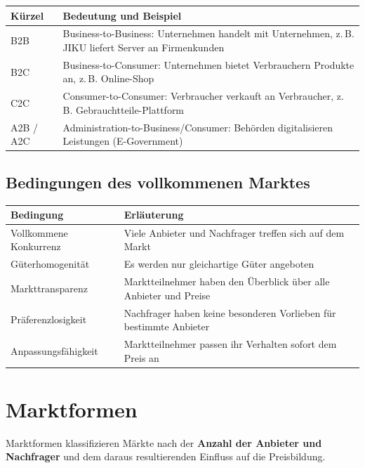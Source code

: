 \documentclass[11pt, a4paper]{article}
\begin{document}
\begin{center}
\begin{tabular}{p{2cm} p{11cm}}
\toprule
\textbf{Kürzel} & \textbf{Bedeutung und Beispiel}\\
\midrule
B2B & Business-to-Business: Unternehmen handelt mit Unternehmen, z.\,B. JIKU liefert Server an Firmenkunden\\
B2C & Business-to-Consumer: Unternehmen bietet Verbrauchern Produkte an, z.\,B. Online-Shop\\
C2C & Consumer-to-Consumer: Verbraucher verkauft an Verbraucher, z.\,B. Gebrauchtteile-Plattform\\
A2B / A2C & Administration-to-Business/Consumer: Behörden digitalisieren Leistungen (E-Government)\\
\bottomrule
\end{tabular}
\end{center}

\subsection{Bedingungen des vollkommenen Marktes}

\begin{center}
\begin{tabular}{p{4cm} p{9cm}}
\toprule
\textbf{Bedingung} & \textbf{Erläuterung}\\
\midrule
Vollkommene Konkurrenz & Viele Anbieter und Nachfrager treffen sich auf dem Markt\\
\addlinespace
Güterhomogenität & Es werden nur gleichartige Güter angeboten\\
\addlinespace
Markttransparenz & Marktteilnehmer haben den Überblick über alle Anbieter und Preise\\
\addlinespace
Präferenzlosigkeit & Nachfrager haben keine besonderen Vorlieben für bestimmte Anbieter\\
\addlinespace
Anpassungsfähigkeit & Marktteilnehmer passen ihr Verhalten sofort dem Preis an\\
\bottomrule
\end{tabular}
\end{center}

\section{Marktformen}

Marktformen klassifizieren Märkte nach der \textbf{Anzahl der Anbieter und Nachfrager} und
dem daraus resultierenden Einfluss auf die Preisbildung.
\end{document}
